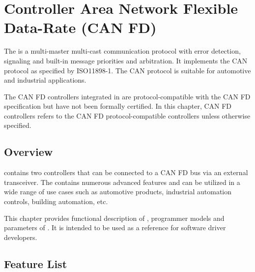 \documentclass[main\_\_EN.tex]{subfiles}
\begin{document}


\ifglobal
\else
    \listoftodos
    {\let\clearpage\relax \listofdonetodos}
    \tableofcontents
\fi



\hypertarget{canfd}{}
\chapter{Controller Area Network Flexible Data-Rate (CAN FD)}
\label{mod:twai}

The \modulename{} is a multi-master multi-cast communication protocol with error detection, signaling and built-in message priorities and arbitration. It implements the CAN protocol as specified by ISO11898-1. The CAN protocol is suitable for automotive and industrial applications.

The CAN FD controllers integrated in \chipname{} are protocol-compatible with the CAN FD specification but have not been formally certified. In this chapter, CAN FD controllers refers to the CAN FD protocol-compatible controllers unless otherwise specified.



\section{Overview}

\chipname{} contains two \modulename{} controllers that can be connected to a CAN FD bus via an external transceiver. The \modulename{} contains numerous advanced features and can be utilized in a wide range of use cases such as automotive products, industrial automation controls, building automation, etc.

This chapter provides functional description of \modulename{}, programmer models and parameters of \modulename{}. It is intended to be used as a reference for software driver developers.



\section{Feature List}
\label{sec:twai-features}
\end{document}
